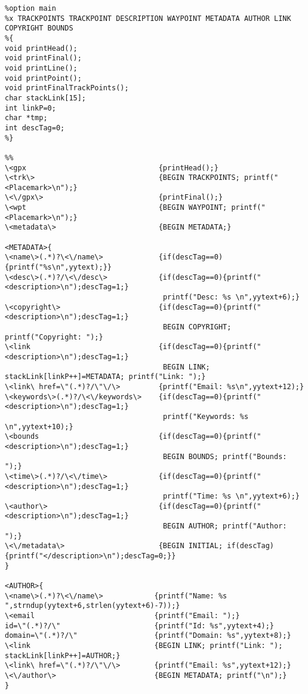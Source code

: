 \documentclass{llncs}
\begin{document}
\small
\begin{changemargin}{-4cm}{0cm}
\begin{verbatim}
%option main
%x TRACKPOINTS TRACKPOINT DESCRIPTION WAYPOINT METADATA AUTHOR LINK COPYRIGHT BOUNDS
%{
void printHead();
void printFinal();
void printLine();
void printPoint();
void printFinalTrackPoints();
char stackLink[15];
int linkP=0;
char *tmp;
int descTag=0;
%}

%%
\<gpx                               {printHead();}
\<trk\>                             {BEGIN TRACKPOINTS; printf("<Placemark>\n");}
\<\/gpx\>                           {printFinal();}
\<wpt                               {BEGIN WAYPOINT; printf("<Placemark>\n");}
\<metadata\>                        {BEGIN METADATA;}

<METADATA>{
\<name\>(.*)?\<\/name\>             {if(descTag==0){printf("%s\n",yytext);}}
\<desc\>(.*)?/\<\/desc\>            {if(descTag==0){printf("<description>\n");descTag=1;}
                                     printf("Desc: %s \n",yytext+6);}
\<copyright\>                       {if(descTag==0){printf("<description>\n");descTag=1;} 
                                     BEGIN COPYRIGHT; printf("Copyright: ");}
\<link                              {if(descTag==0){printf("<description>\n");descTag=1;} 
                                     BEGIN LINK; stackLink[linkP++]=METADATA; printf("Link: ");}
\<link\ href=\"(.*)?/\"\/\>         {printf("Email: %s\n",yytext+12);}
\<keywords\>(.*)?/\<\/keywords\>    {if(descTag==0){printf("<description>\n");descTag=1;} 
                                     printf("Keywords: %s \n",yytext+10);}
\<bounds                            {if(descTag==0){printf("<description>\n");descTag=1;} 
                                     BEGIN BOUNDS; printf("Bounds: ");}
\<time\>(.*)?/\<\/time\>            {if(descTag==0){printf("<description>\n");descTag=1;} 
                                     printf("Time: %s \n",yytext+6);}
\<author\>                          {if(descTag==0){printf("<description>\n");descTag=1;} 
                                     BEGIN AUTHOR; printf("Author: ");}
\<\/metadata\>                      {BEGIN INITIAL; if(descTag){printf("</description>\n");descTag=0;}}
}

<AUTHOR>{
\<name\>(.*)?\<\/name\>            {printf("Name: %s ",strndup(yytext+6,strlen(yytext+6)-7));}
\<email                            {printf("Email: ");}
id=\"(.*)?/\"                      {printf("Id: %s",yytext+4);}
domain=\"(.*)?/\"                  {printf("Domain: %s",yytext+8);}
\<link                             {BEGIN LINK; printf("Link: "); stackLink[linkP++]=AUTHOR;}
\<link\ href=\"(.*)?/\"\/\>        {printf("Email: %s",yytext+12);}
\<\/author\>                       {BEGIN METADATA; printf("\n");}
}


\end{verbatim}
\end{changemargin}
\end{document}
